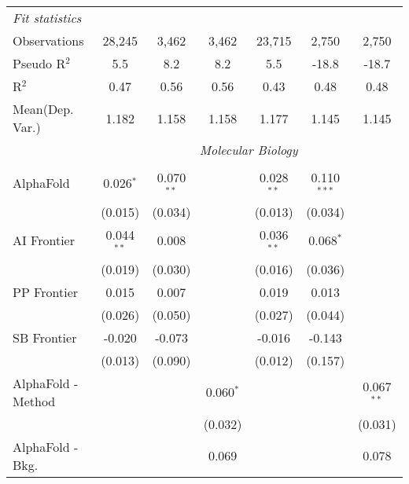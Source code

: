 \begin{tabular}{lcccccc}
   \midrule
   \emph{Fit statistics}\\
   Observations                  & 28,245        & 3,462       & 3,462          & 23,715        & 2,750         & 2,750\\  
   Pseudo R$^2$                  & 5.5           & 8.2         & 8.2            & 5.5           & -18.8         & -18.7\\  
   R$^2$                         & 0.47          & 0.56        & 0.56           & 0.43          & 0.48          & 0.48\\  
Mean(Dep. Var.) & 1.182 & 1.158 & 1.158 & 1.177 & 1.145 & 1.145 \\
   
 & \multicolumn{6}{c}{\textit{Molecular Biology}} \\ \\
   AlphaFold                     & 0.026$^{*}$  & 0.070$^{**}$ &              & 0.028$^{**}$ & 0.110$^{***}$ &   \\   
                                 & (0.015)      & (0.034)      &              & (0.013)      & (0.034)       &   \\   
   AI Frontier                   & 0.044$^{**}$ & 0.008        &              & 0.036$^{**}$ & 0.068$^{*}$   &   \\   
                                 & (0.019)      & (0.030)      &              & (0.016)      & (0.036)       &   \\   
   PP Frontier                   & 0.015        & 0.007        &              & 0.019        & 0.013         &   \\   
                                 & (0.026)      & (0.050)      &              & (0.027)      & (0.044)       &   \\   
   SB Frontier                   & -0.020       & -0.073       &              & -0.016       & -0.143        &   \\   
                                 & (0.013)      & (0.090)      &              & (0.012)      & (0.157)       &   \\   
   AlphaFold - Method            &              &              & 0.060$^{*}$  &              &               & 0.067$^{**}$\\   
                                 &              &              & (0.032)      &              &               & (0.031)\\   
   AlphaFold - Bkg.              &              &              & 0.069        &              &               & 0.078\\   

\end{tabular}
